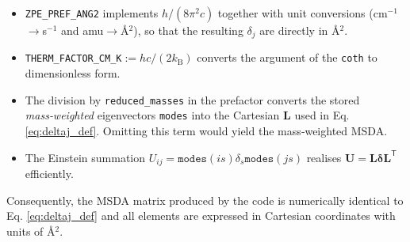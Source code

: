 \documentclass{standalone}
\begin{document}
\begin{itemize}

\item \texttt{ZPE\_PREF\_ANG2} implements $h/(8\pi^{2}c)$ together with
unit conversions (cm$^{-1}$$\to$s$^{-1}$ and amu$\to$\r{A}$^{2}$), so that the resulting
$\delta_j$ are directly in \r{A}$^{2}$.
\item \texttt{THERM\_FACTOR\_CM\_K}$:=h c/(2k_{\mathrm B})$ converts the argument of the
\texttt{coth} to dimensionless form.

\item The division by \texttt{reduced\_masses} in the prefactor converts the stored
\emph{mass‑weighted} eigenvectors \texttt{modes} into the Cartesian $\mathbf L$ used
in Eq. \eqref{eq:deltaj_def}.  Omitting this term would yield the mass‑weighted MSDA.

\item The Einstein summation
$U_{ij}=\texttt{modes}(is)\delta_s\texttt{modes}(js)$ realises
$\mathbf U=\mathbf L\boldsymbol\delta\mathbf L^{\mathsf T}$ efficiently.
\end{itemize}

Consequently, the MSDA matrix produced by the code is numerically identical to
Eq. \eqref{eq:deltaj_def} and all elements are expressed in Cartesian coordinates with units of
\r{A}$^{2}$.
\end{document}

